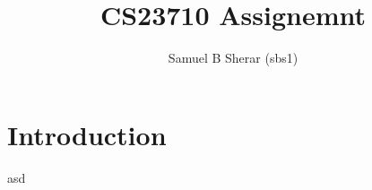 \documentclass{article}
\begin{document}
\title{CS23710 Assignemnt}
\author{Samuel B Sherar (sbs1)}

\maketitle

\section{Introduction}
asd
\end{document}
